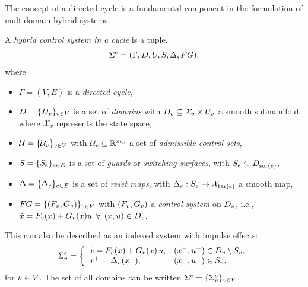 The concept of a directed cycle is a fundamental component in the formulation
of multidomain hybrid systems:

\begin{definition} A {\em hybrid control system in a cycle} is a tuple,
  \begin{align*}
    \Sigma^{c} = (\Gamma, D, U, S, \Delta, FG),
  \end{align*}
  where
  \begin{itemize}
  \item $\Gamma = (V, E)$ is a {\em directed cycle},
  \item $D = \{D_{v}\}_{v \in V}$ is a set of {\em domains} with $D_{v}
    \subseteq \mathcal{X}_{v} \times U_{v}$ a smooth submanifold, where
    $\mathcal{X}_{v}$ represents the state space,
  \item $\mathcal{U} = \{\mathcal{U}_{v}\}_{v \in V}$ with $\mathcal{U}_{v} \subseteq \mathbb{R}^{m_{v}}$ a set of
    {\em admissible control sets},
  \item $S = \{S_{e}\}_{e \in E}$ is a set of {\em guards} or {\em
      switching surfaces}, with $S_{e} \subseteq D_{\mathrm{sor}(e)}$,
  \item $\Delta = \{\Delta_{e}\}_{e \in E}$ is a set of {\em reset maps}, with
    $\Delta_{e} : S_{e} \to \mathcal{X}_{\mathrm{tar}(e)}$ a smooth map,
  \item $FG = \{(F_{v}, G_{v})\}_{v \in V}$ with $(F_{v}, G_{v})$ a {\em control
      system} on $D_{v}$, i.e., ${\dot {x}} = F_{v}(x) + G_{v}(x) u$ $\forall$
    $(x, u) \in D_{v}$.
  \end{itemize}
  This can also be described as an indexed system with impulse effects:
  \begin{align}
    \label{eq:HCSi}
    \Sigma^{c}_{v} = \left\{
      \begin{array}{l l}
        {\dot {x}} = F_{v}(x) + G_{v}(x) \, u, & (x^{-}, u^{-}) \in D_{v} \setminus
        S_{v},\\
        x^{+} = \Delta_{v}(x^{-}), & (x^{-}, u^{-}) \in S_{v},
      \end{array}\right.
  \end{align}
  for $v \in V$.
  The set of all domains can be written $\Sigma^{c} = \{\Sigma^{c}_{v}\}_{v \in V}$.
\end{definition}

